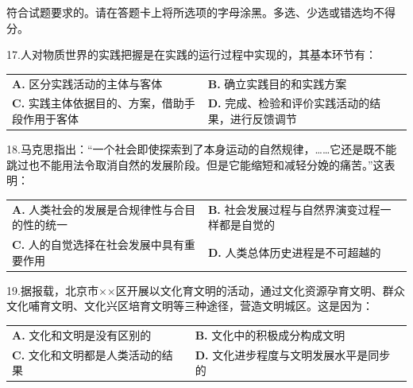 \documentclass[UTF8,11pt]{ctexart}
\begin{document}
符合试题要求的。请在答题卡上将所选项的字母涂黑。多选、少选或错选均不得分。


17.人对物质世界的实践把握是在实践的运行过程中实现的，其基本环节有：


\begin{center}\begin{tabular}{>{\raggedright\arraybackslash}p{\dimexpr(\linewidth-4\tabcolsep)/2\relax}>{\raggedright\arraybackslash}p{\dimexpr(\linewidth-4\tabcolsep)/2\relax}}
\textbf{A.} 区分实践活动的主体与客体 & \textbf{B.} 确立实践目的和实践方案\\[.35em]
\textbf{C.} 实践主体依据目的、方案，借助手段作用于客体 & \textbf{D.} 完成、检验和评价实践活动的结果，进行反馈调节\\[.35em]\end{tabular}\end{center}

18.马克思指出：“一个社会即使探索到了本身运动的自然规律，……它还是既不能跳过也不能用法令取消自然的发展阶段。但是它能缩短和减轻分娩的痛苦。”这表明：


\begin{center}\begin{tabular}{>{\raggedright\arraybackslash}p{\dimexpr(\linewidth-4\tabcolsep)/2\relax}>{\raggedright\arraybackslash}p{\dimexpr(\linewidth-4\tabcolsep)/2\relax}}
\textbf{A.} 人类社会的发展是合规律性与合目的性的统一 & \textbf{B.} 社会发展过程与自然界演变过程一样都是自觉的\\[.35em]
\textbf{C.} 人的自觉选择在社会发展中具有重要作用 & \textbf{D.} 人类总体历史进程是不可超越的\\[.35em]\end{tabular}\end{center}

19.据报载，北京市××区开展以文化育文明的活动，通过文化资源孕育文明、群众文化哺育文明、文化兴区培育文明等三种途径，营造文明城区。这是因为：


\begin{center}\begin{tabular}{>{\raggedright\arraybackslash}p{\dimexpr(\linewidth-4\tabcolsep)/2\relax}>{\raggedright\arraybackslash}p{\dimexpr(\linewidth-4\tabcolsep)/2\relax}}
\textbf{A.} 文化和文明是没有区别的 & \textbf{B.} 文化中的积极成分构成文明\\[.35em]
\textbf{C.} 文化和文明都是人类活动的结果 & \textbf{D.} 文化进步程度与文明发展水平是同步的\\[.35em]\end{tabular}\end{center}
\end{document}
